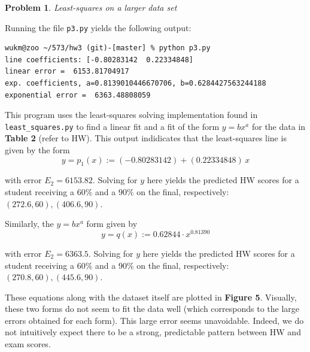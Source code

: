 \documentclass[10pt]{article}
\theoremstyle{plain}
\theoremstyle{definition}
\newtheorem{prob}{Problem}
\numberwithin{equation}{section}
\begin{document}
\begin{prob} \textit{Least-squares on a larger data set}

    Running the file \texttt{p3.py} yields the following output:
\begin{verbatim}
wukm@zoo ~/573/hw3 (git)-[master] % python p3.py
line coefficients: [-0.80283142  0.22334848]
linear error =  6153.81704917
exp. coefficients, a=0.8139010446670706, b=0.6284427563244188
exponential error =  6363.48808059
\end{verbatim}

This program uses the least-squares solving implementation found in 
\texttt{least\_squares.py} to find a linear fit and a fit of the form
$y=bx^a$ for the data in \textbf{Table 2} (refer to HW).
This output indidicates that the least-squares line is given by the form
    \[
            y = p_1(x) := (-0.80283142) + (0.22334848)\,x
    \]

with error $E_2 = 6153.82$. Solving for $y$ here yields the predicted HW scores for
a student receiving a $60\%$ and a $90\%$ on the final, respectively:
$(272.6,60), (406.6,90)$.

Similarly, the $y=bx^a$ form given by
    \[
            y = q(x) := 0.62844 \cdot x^{0.81390}
        \]

with error $E_2 = 6363.5$. Solving for $y$ here yields the predicted HW scores for
a student receiving a $60\%$ and a $90\%$ on the final, respectively:
$(270.8,60), (445.6,90)$.

These equations along with the dataset itself are plotted in \textbf{Figure 5}.
Visually, these two forms do not seem to fit the data well
(which corresponds to the large errors obtained for each form).
This large error seems unavoidable. Indeed, we do not intuitively expect there to be a strong,
predictable pattern between HW and exam scores.

\end{prob}

\hrulefill
\end{document}
